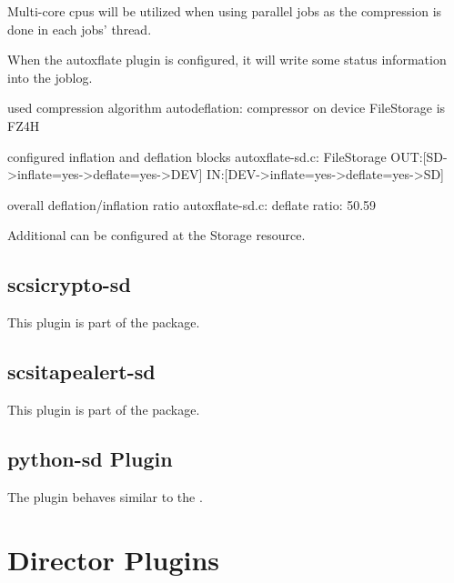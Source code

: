 Multi-core cpus will be utilized when using parallel jobs as the compression is done in each jobs' thread.

When the autoxflate plugin is configured, it will write some status information into the joblog.

\begin{bmessage}{used compression algorithm}
autodeflation: compressor on device FileStorage is FZ4H
\end{bmessage}

\begin{bmessage}{configured inflation and deflation blocks}
autoxflate-sd.c: FileStorage OUT:[SD->inflate=yes->deflate=yes->DEV] IN:[DEV->inflate=yes->deflate=yes->SD]
\end{bmessage}

\begin{bmessage}{overall deflation/inflation ratio}
autoxflate-sd.c: deflate ratio: 50.59%
\end{bmessage}

Additional  can be configured at the Storage resource.


\subsection{scsicrypto-sd}

This plugin is part of the  package.

\subsection{scsitapealert-sd}

This plugin is part of the  package.


\subsection{python-sd Plugin}

The  plugin behaves similar to the .


\section{Director Plugins}
\label{dirPlugins}

